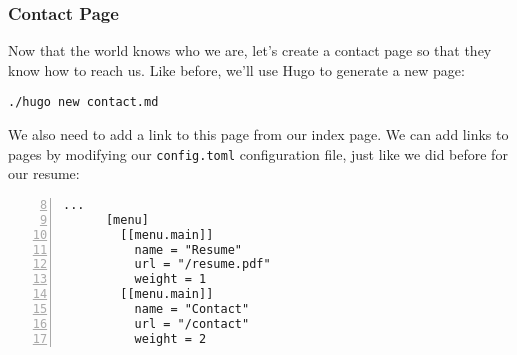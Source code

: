 \begin{frame}[fragile]
    \frametitle{Contact Page}

    Now that the world knows who we are, let's create a contact page so that they know how to reach us.
    Like before, we'll use Hugo to generate a new page:

    \medskip

    \begin{lstlisting}[style=saneCode,gobble=6]
      ./hugo new contact.md
    \end{lstlisting}

    \vfill

    We also need to add a link to this page from our index page. We can add links to pages by modifying our 
    \texttt{config.toml} configuration file, just like we did before for our resume:

    \begin{lstlisting}[style=saneCode,gobble=6,title={config.toml},numbers=left,firstnumber=8]
      ...
      [menu]
        [[menu.main]]
          name = "Resume"
          url = "/resume.pdf"
          weight = 1
        [[menu.main]]
          name = "Contact"
          url = "/contact"
          weight = 2
    \end{lstlisting}
\end{frame}